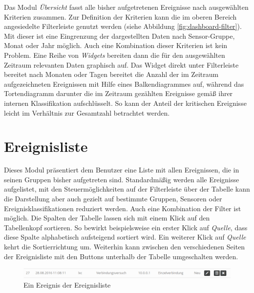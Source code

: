 \documentclass[12pt]{article}
\begin{document}
Das Modul \textit{Übersicht} fasst alle bisher aufgetretenen Ereignisse nach ausgewählten Kriterien zusammen. Zur Definition der Kriterien kann die im oberen Bereich angesiedelte Filterleiste genutzt werden (siehe Abbildung \ref{fig:dashboard-filter}). Mit dieser ist eine Eingrenzung der dargestellten Daten nach Sensor-Gruppe, Monat oder Jahr möglich. Auch eine Kombination dieser Kriterien ist kein Problem. Eine Reihe von \textit{Widgets} bereiten dann die für den ausgewählten Zeitraum relevanten Daten graphisch auf. Das Widget direkt unter Filterleiste bereitet nach Monaten oder Tagen bereitet die Anzahl der im Zeitraum aufgezeichneten Ereignissen mit Hilfe eines Balkendiagrammes auf, während das Tortendiagramm darunter die im Zeitraum gezählten Ereignisse gemäß ihrer internen Klassifikation aufschlüsselt. So kann der Anteil der kritischen Ereignisse leicht im Verhältnis zur Gesamtzahl betrachtet werden.

\section{Ereignisliste} \label{eventlist}
Dieses Modul präsentiert dem Benutzer eine Liste mit allen Ereignissen, die in seinen Gruppen bisher aufgetreten sind. Standardmäßig werden alle Ereignisse aufgelistet, mit den Steuermöglichkeiten auf der Filterleiste über der Tabelle kann die Darstellung aber auch gezielt auf bestimmte Gruppen, Sensoren oder Ereignisklassifikationen reduziert werden. Auch eine Kombination der Filter ist möglich. Die Spalten der Tabelle lassen sich mit einem Klick auf den Tabellenkopf sortieren. So bewirkt beispielsweise ein erster Klick auf \textit{Quelle}, dass diese Spalte alphabetisch aufsteigend sortiert wird. Ein weiterer Klick auf \textit{Quelle} kehrt die Sortierrichtung um. Weiterhin kann zwischen den verschiedenen Seiten der Ereignisliste mit den Buttons unterhalb der Tabelle umgeschalten werden.

\begin{figure}[h]
				\centering
				\includegraphics[width=\textwidth]{./graphics/events-event.png}
				\caption{Ein Ereignis der Ereignisliste}
				\label{fig:events-event}
\end{figure}
\end{document}
